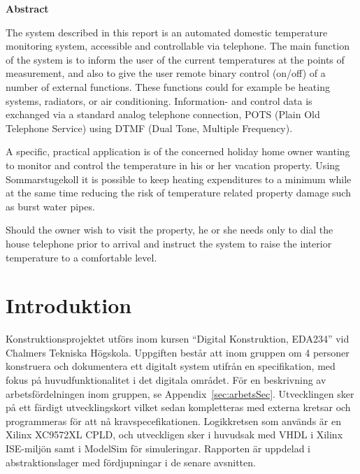 \documentclass[a4paper,11pt]{article}
\begin{document}
\begin{center}
	{\noindent \bf Abstract}
\end{center}

	The system described in this report is an automated domestic temperature monitoring system, accessible and controllable via
	telephone. The main function of the system is to inform the user of the current temperatures
	at the points of measurement, and also to give the user remote binary control (on/off) of a number of external
	functions. These functions could for example be heating systems, radiators, or air conditioning. Information- and control data
	is exchanged via a standard analog telephone connection, POTS (Plain Old Telephone Service) using DTMF (Dual Tone, Multiple Frequency).

	A specific, practical application is of the concerned holiday home owner wanting to monitor and control the temperature 
	in his or her vacation property. Using Sommarstugekoll it is possible to keep heating expenditures to a minimum while at 
	the same time reducing the risk of temperature related property damage such as burst water pipes.

	Should the owner wish to visit the property, he or she needs only to dial the house telephone prior to arrival and instruct the system to raise
	the interior temperature to a comfortable level. 

\pagebreak

 \thispagestyle{empty}
	\tableofcontents
 \thispagestyle{empty}

\pagebreak

\setcounter{page}{1}
\section{Introduktion}

	Konstruktionsprojektet utförs inom kursen ``Digital Konstruktion, EDA234'' vid Chalmers Tekniska Högskola. Uppgiften består att inom gruppen om 4 personer konstruera och dokumentera
	ett digitalt system utifrån en specifikation, med fokus på huvudfunktionalitet i det digitala området. För en beskrivning av arbetsfördelningen inom gruppen, se Appendix~\ref{sec:arbetsSec}. Utvecklingen sker på ett färdigt utvecklingskort vilket sedan kompletteras med externa kretsar och programmeras för att nå kravspecefikationen. Logikkretsen som används är en Xilinx XC9572XL CPLD, och utveckligen sker i huvudsak med VHDL i Xilinx ISE-miljön samt i ModelSim för simuleringar. Rapporten är uppdelad i abstraktionslager med fördjupningar i de senare avsnitten. 
\end{document}

